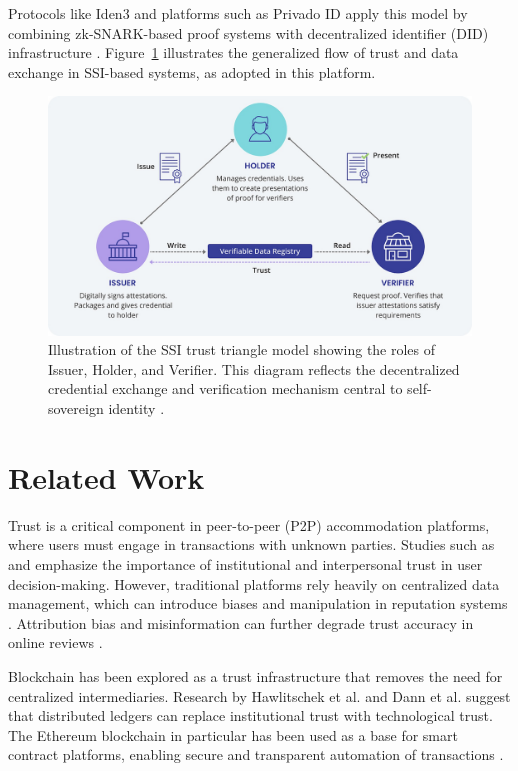 \documentclass[conference]{IEEEtran}
\begin{document}
Protocols like Iden3 and platforms such as Privado ID apply this model by combining zk-SNARK-based proof systems with decentralized identifier (DID) infrastructure \cite{iden3docs, mittal2025}. Figure~\ref{fig:trust-triangle} illustrates the generalized flow of trust and data exchange in SSI-based systems, as adopted in this platform.

\begin{figure}[h!]
  \centering
  \includegraphics[width=1\linewidth]{trust-triangle.jpg}
  \caption{Illustration of the SSI trust triangle model showing the roles of Issuer, Holder, and Verifier. This diagram reflects the decentralized credential exchange and verification mechanism central to self-sovereign identity \cite{cheqd2023}.}
  \label{fig:trust-triangle}
\end{figure}

\section{Related Work}
\label{sec:related-work}
Trust is a critical component in peer-to-peer (P2P) accommodation platforms, where users must engage in transactions with unknown parties. Studies such as \cite{agag2019} and \cite{oliveira2017} emphasize the importance of institutional and interpersonal trust in user decision-making. However, traditional platforms rely heavily on centralized data management, which can introduce biases and manipulation in reputation systems \cite{hawlitschek2018, tussyadiah2018}. Attribution bias and misinformation can further degrade trust accuracy in online reviews \cite{huang2021, zloteanu2021}.

Blockchain has been explored as a trust infrastructure that removes the need for centralized intermediaries. Research by Hawlitschek et al. \cite{hawlitschek2018} and Dann et al. \cite{dann2020} suggest that distributed ledgers can replace institutional trust with technological trust. The Ethereum blockchain in particular has been used as a base for smart contract platforms, enabling secure and transparent automation of transactions \cite{buterin2014, wood2022, antonopoulos2019}.
\end{document}
